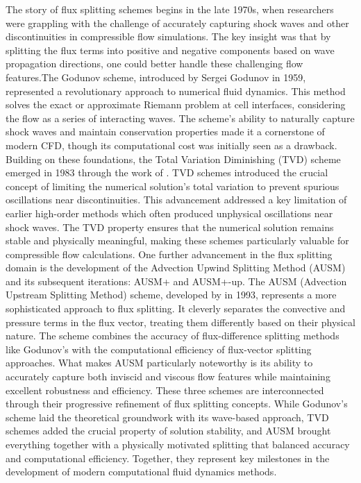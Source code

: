 \documentclass[a5paper]{sapthesis}
\begin{document}
	The story of flux splitting schemes begins in the late 1970s, when researchers were grappling with the challenge of accurately capturing shock waves and other discontinuities in compressible flow simulations. The key insight was that by splitting the flux terms into positive and negative components based on wave propagation directions, one could better handle these challenging flow features.The Godunov scheme, introduced by Sergei Godunov in 1959, represented a revolutionary approach to numerical fluid dynamics. This method solves the exact or approximate Riemann problem at cell interfaces, considering the flow as a series of interacting waves. The scheme's ability to naturally capture shock waves and maintain conservation properties made it a cornerstone of modern CFD, though its computational cost was initially seen as a drawback. Building on these foundations, the Total Variation Diminishing (TVD) scheme emerged in 1983 through the work of \citet{HARTEN1983}. TVD schemes introduced the crucial concept of limiting the numerical solution's total variation to prevent spurious oscillations near discontinuities. This advancement addressed a key limitation of earlier high-order methods which often produced unphysical oscillations near shock waves. The TVD property ensures that the numerical solution remains stable and physically meaningful, making these schemes particularly valuable for compressible flow calculations.
	One further advancement in the flux splitting domain is the development of the Advection Upwind Splitting Method (AUSM) and its subsequent iterations: AUSM+ and AUSM+-up. The AUSM (Advection Upstream Splitting Method) scheme, developed by \citet{LIOU_AUSM} in 1993, represents a more sophisticated approach to flux splitting. It cleverly separates the convective and pressure terms in the flux vector, treating them differently based on their physical nature. The scheme combines the accuracy of flux-difference splitting methods like Godunov's with the computational efficiency of flux-vector splitting approaches. What makes AUSM particularly noteworthy is its ability to accurately capture both inviscid and viscous flow features while maintaining excellent robustness and efficiency. These three schemes are interconnected through their progressive refinement of flux splitting concepts. While Godunov's scheme laid the theoretical groundwork with its wave-based approach, TVD schemes added the crucial property of solution stability, and AUSM brought everything together with a physically motivated splitting that balanced accuracy and computational efficiency. Together, they represent key milestones in the development of modern computational fluid dynamics methods.\\
	
\end{document}
